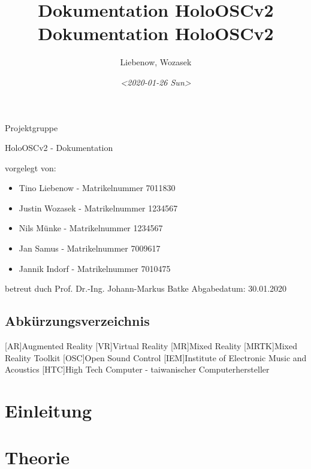 \documentclass[11pt, titlepage, fleqn]{report}
\author{Liebenow, Wozasek}
\date{\textit{<2020-01-26 Sun>}}
\title{Dokumentation HoloOSCv2\\\medskip
\large Dokumentation HoloOSCv2}
\begin{document}
    \begin{titlepage}%
        \hsellogo\hfill Projektgruppe %
        \par
        \vspace{4cm}
        \noindent\parbox{0.8\textwidth}{\Huge\sloppy
	    HoloOSCv2 - Dokumentation}  
        \vspace{2cm}

        \Large \noindent vorgelegt von:
        \begin{itemize}
            \item Tino Liebenow - Matrikelnummer 7011830
            \item Justin Wozasek - Matrikelnummer 1234567
            \item Nils Münke - Matrikelnummer 1234567
            \item Jan  Samus - Matrikelnummer 7009617
            \item Jannik Indorf - Matrikelnummer 7010475
        \end{itemize}
        \vspace{2cm}
        betreut duch\newline
        Prof. Dr.-Ing. Johann-Markus Batke\newline
        Abgabedatum: 30.01.2020
    \end{titlepage}
    \newpage
    \tableofcontents %
    \listoffigures%
    \newpage
    \section*{\Huge Abkürzungsverzeichnis}%
    \label{sec:Abkürzungsverzeichnis}
    \vspace{1cm}
    \begin{acronym}
        [AR]{Augmented Reality}
        [VR]{Virtual Reality}
        [MR]{Mixed Reality}
        [MRTK]{Mixed Reality Toolkit}
        [OSC]{Open Sound Control}
        [IEM]{Institute of Electronic Music and Acoustics}
        [HTC]{High Tech Computer - taiwanischer Computerhersteller}
    \end{acronym}  
    \newpage
    \chapter{Einleitung}%
    \label{sec:Einleitung}
   
    
    \chapter{Theorie}%
    \label{sec:Theorie}
\end{document}
